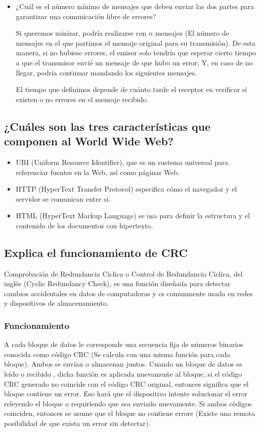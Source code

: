\documentclass[spanish,12pt,letterpaper]{article}
\begin{document}
\begin{itemize}
\item ¿Cuál es el número mínimo de mensajes que deben enviar las dos partes para
  garantizar una comunicación libre de errores?

  Si queremos minizar, podría realizarse con $n$ mensajes (El número de mensajes
  en el que partimos el mensaje original para su transmisión). De esta manera, si
  no hubiese errores, el emisor solo tendría que esperar cierto tiempo a que el
  transmisor envié un mensaje de que hubo un error; Y, en caso de no llegar,
  podría continuar mandando los siguientes mensajes.

  El tiempo que definimos depende de cuánto tarde el receptor en verificar si
  existen o no errores en el mensaje recibido.

\end{itemize}

\subsection{¿Cuáles son las tres características que componen al World Wide Web?}

\begin{itemize}
\item URI (Uniform Resource Identifier), que es un sustema universal para
  referenciar fuentes en la Web, así como páginas Web.
  
\item HTTP (HyperText Transfer Protocol) especifica cómo el navegador y el
  servidor se comunican entre si.
\item HTML (HyperText Markup Language) se usa para definir la estructura y el
  contenido de los documentos con hipertexto.
\end{itemize}


\subsection{Explica el funcionamiento de CRC}

Comprobación de Redundancia Cíclica o Control de Redundancia Cíclica, del inglés
(Cyclic Redundancy Check), es una función diseñada para detectar cambios
accidentales en datos de computadoras y es comunmente usada en redes y
dispositivos de almacenamiento.

\subsubsection{Funcionamiento}
A cada bloque de datos le corresponde una secuencia fija de números binarios
conocida como código CRC (Se calcula con una misma función para cada bloque).
Ambos se envían o almacenan juntos. Cuando un bloque de datos es leído o recibido
, dicha función es aplicada nuevamente al bloque, si el código CRC generado no
coincide con el código CRC original, entonces significa que el bloque contiene
un error. Eso hará que el dispositivo intente solucionar el error releyendo el
bloque o requiriendo que sea enviado nuevamente. Si ambos códigos coinciden,
entonces se asume que el bloque no contiene errore (Existe una remota posibilidad
de que exista un error sin detectar).
\end{document}
